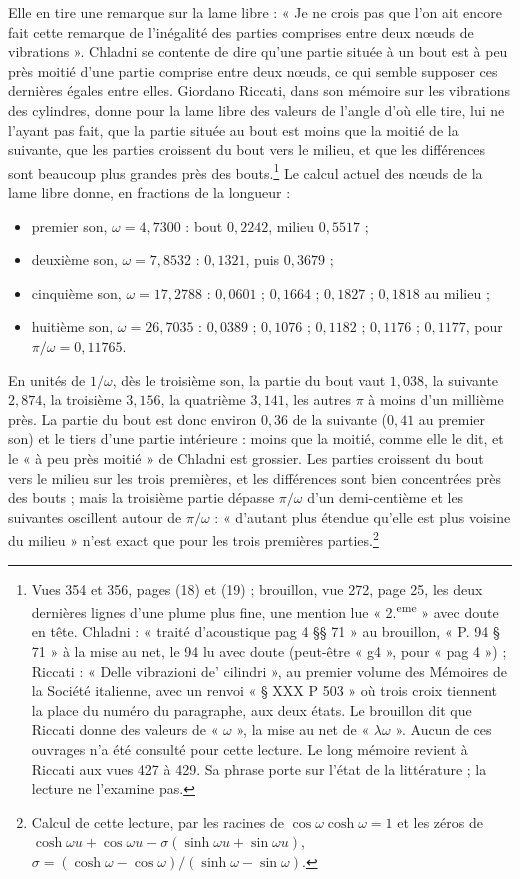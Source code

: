 \documentclass[11pt,a4paper]{article}
\begin{document}
Elle en tire une remarque sur la lame libre : « Je ne crois pas que l'on ait encore fait cette remarque de l'inégalité des parties comprises entre deux nœuds de vibrations ». Chladni se contente de dire qu'une partie située à un bout est à peu près moitié d'une partie comprise entre deux nœuds, ce qui semble supposer ces dernières égales entre elles. Giordano Riccati, dans son mémoire sur les vibrations des cylindres, donne pour la lame libre des valeurs de l'angle d'où elle tire, lui ne l'ayant pas fait, que la partie située au bout est moins que la moitié de la suivante, que les parties croissent du bout vers le milieu, et que les différences sont beaucoup plus grandes près des bouts.\footnote{Vues 354 et 356, pages (18) et (19) ; brouillon, vue 272, page 25, les deux dernières lignes d'une plume plus fine, une mention lue « 2.\textsuperscript{eme} » avec doute en tête. Chladni : « traité d'acoustique pag 4 §§ 71 » au brouillon, « P. 94 § 71 » à la mise au net, le 94 lu avec doute (peut-être « g4 », pour « pag 4 ») ; Riccati : « Delle vibrazioni de' cilindri », au premier volume des Mémoires de la Société italienne, avec un renvoi « § XXX P 503 » où trois croix tiennent la place du numéro du paragraphe, aux deux états. Le brouillon dit que Riccati donne des valeurs de « $\omega$ », la mise au net de « $\lambda\omega$ ». Aucun de ces ouvrages n'a été consulté pour cette lecture. Le long mémoire revient à Riccati aux vues 427 à 429. Sa phrase porte sur l'état de la littérature ; la lecture ne l'examine pas.} Le calcul actuel des nœuds de la lame libre donne, en fractions de la longueur :
\begin{itemize}
\item premier son, $\omega=4{,}7300$ : bout $0{,}2242$, milieu $0{,}5517$ ;
\item deuxième son, $\omega=7{,}8532$ : $0{,}1321$, puis $0{,}3679$ ;
\item cinquième son, $\omega=17{,}2788$ : $0{,}0601$ ; $0{,}1664$ ; $0{,}1827$ ; $0{,}1818$ au milieu ;
\item huitième son, $\omega=26{,}7035$ : $0{,}0389$ ; $0{,}1076$ ; $0{,}1182$ ; $0{,}1176$ ; $0{,}1177$, pour $\pi/\omega=0{,}11765$.
\end{itemize}
En unités de $1/\omega$, dès le troisième son, la partie du bout vaut $1{,}038$, la suivante $2{,}874$, la troisième $3{,}156$, la quatrième $3{,}141$, les autres $\pi$ à moins d'un millième près. La partie du bout est donc environ $0{,}36$ de la suivante ($0{,}41$ au premier son) et le tiers d'une partie intérieure : moins que la moitié, comme elle le dit, et le « à peu près moitié » de Chladni est grossier. Les parties croissent du bout vers le milieu sur les trois premières, et les différences sont bien concentrées près des bouts ; mais la troisième partie dépasse $\pi/\omega$ d'un demi-centième et les suivantes oscillent autour de $\pi/\omega$ : « d'autant plus étendue qu'elle est plus voisine du milieu » n'est exact que pour les trois premières parties.\footnote{Calcul de cette lecture, par les racines de $\cos\omega\cosh\omega=1$ et les zéros de $\cosh\omega u+\cos\omega u-\sigma(\sinh\omega u+\sin\omega u)$, $\sigma=(\cosh\omega-\cos\omega)/(\sinh\omega-\sin\omega)$.}
\end{document}
